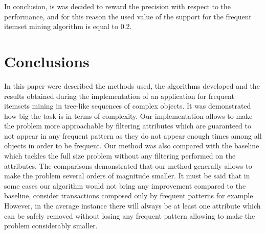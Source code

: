 \documentclass{acm_proc_article-sp-sigmod09}
\begin{document}
In conclusion, is was decided to reward the precision with respect to the performance, and for this reason the used value of the support for the frequent itemset mining algorithm is equal to 0.2.

\section{Conclusions}
In this paper were described the methods used, the algorithms developed and the results obtained during the implementation of an application for frequent itemsets mining in tree-like sequences of complex objects. It was demonstrated how big the task is in terms of complexity. Our implementation allows to make the problem more approachable by filtering attributes which are guaranteed to not appear in any frequent pattern as they do not appear enough times among all objects in order to be frequent. Our method was also compared with the baseline which tackles the full size problem without any filtering performed on the attributes. The comparisons demonstrated that our method generally allows to make the problem several orders of magnitude smaller. It must be said that in some cases our algorithm would not bring any improvement compared to the baseline, consider transactions composed only by frequent patterns for example. However, in the average instance there will always be at least one attribute which can be safely removed without losing any frequent pattern allowing to make the problem considerably smaller.

%

\end{document}
